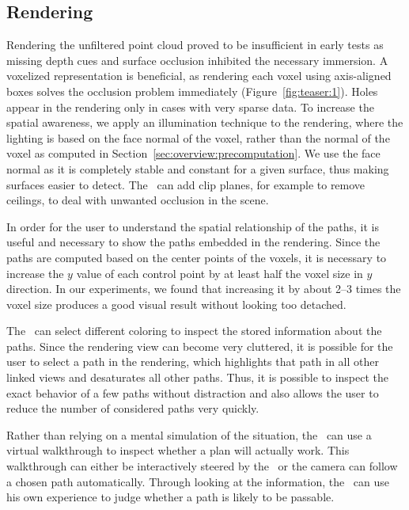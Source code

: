 \subsection{Rendering} \label{sec:overview:rendering}
 Rendering the unfiltered point cloud proved to be insufficient in early tests as missing depth cues and surface occlusion inhibited the necessary immersion. A voxelized representation is beneficial, as rendering each voxel using axis-aligned boxes solves the occlusion problem immediately (Figure~\ref{fig:teaser:1}). Holes appear in the rendering only in cases with very sparse data. To increase the spatial awareness, we apply an illumination technique to the rendering, where the lighting is based on the face normal of the voxel, rather than the normal of the voxel as computed in Section~\ref{sec:overview:precomputation}. We use the face normal as it is completely stable and constant for a given surface, thus making surfaces easier to detect. The \IC\ can add clip planes, for example to remove ceilings, to deal with unwanted occlusion in the scene.

 In order for the user to understand the spatial relationship of the paths, it is useful and necessary to show the paths embedded in the rendering. Since the paths are computed based on the center points of the voxels, it is necessary to increase the $y$ value of each control point by at least half the voxel size in $y$ direction. In our experiments, we found that increasing it by about 2--3 times the voxel size produces a good visual result without looking too detached.

The \IC\ can select different coloring to inspect the stored information about the paths. Since the rendering view can become very cluttered, it is possible for the user to select a path in the rendering, which highlights that path in all other linked views and desaturates all other paths. Thus, it is possible to inspect the exact behavior of a few paths without distraction and also allows the user to reduce the number of considered paths very quickly.

Rather than relying on a mental simulation of the situation, the \IC\ can use a virtual walkthrough to inspect whether a plan will actually work. This walkthrough can either be interactively steered by the \IC\ or the camera can follow a chosen path automatically. Through looking at the information, the \IC\ can use his own experience to judge whether a path is likely to be passable.